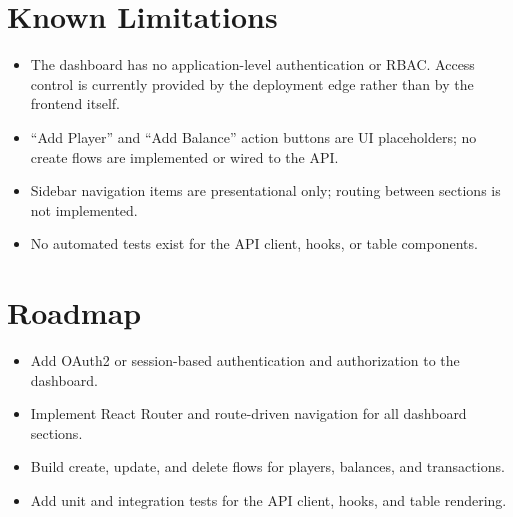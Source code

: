 \section{Known Limitations}

\begin{itemize}
  \item The dashboard has no application-level authentication or RBAC. Access control is currently provided by the deployment edge rather than by the frontend itself.
  \item ``Add Player'' and ``Add Balance'' action buttons are UI placeholders; no create flows are implemented or wired to the API.
  \item Sidebar navigation items are presentational only; routing between sections is not implemented.
  \item No automated tests exist for the API client, hooks, or table components.
\end{itemize}

\section{Roadmap}

\begin{itemize}
  \item Add OAuth2 or session-based authentication and authorization to the dashboard.
  \item Implement React Router and route-driven navigation for all dashboard sections.
  \item Build create, update, and delete flows for players, balances, and transactions.
  \item Add unit and integration tests for the API client, hooks, and table rendering.
\end{itemize}
